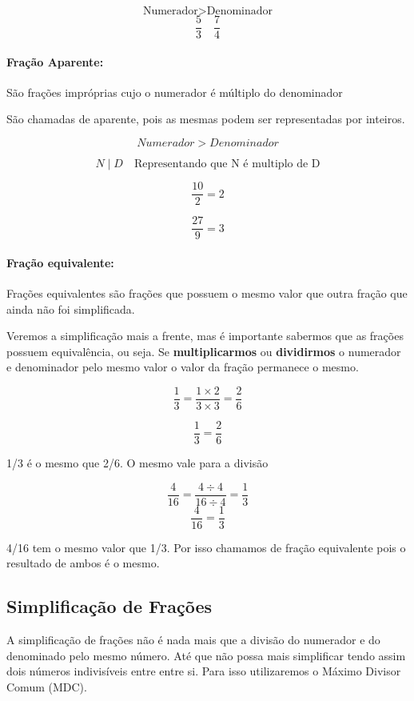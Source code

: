 \documentclass[letterpaper]{book}
\begin{document}
\[\text{Numerador} > \text{Denominador}\]
\[\dfrac{5}{3} \quad \dfrac{7}{4}\]

\paragraph{Fração Aparente:} São frações impróprias cujo o numerador é múltiplo do denominador

São chamadas de aparente, pois as mesmas podem ser representadas por inteiros.

\[Numerador > Denominador\]

\[N \mid D \quad \text{Representando que N é multiplo de D}\]

\[\dfrac{10}{2} = 2\]

\[\dfrac{27}{9} = 3\]

\paragraph{Fração equivalente:} Frações equivalentes são frações que possuem o mesmo valor que outra fração que ainda não foi simplificada.

Veremos a simplificação mais a frente, mas é importante sabermos que as frações possuem equivalência, ou seja.
Se \textbf{multiplicarmos} ou \textbf{dividirmos} o numerador e denominador pelo mesmo valor o valor da fração permanece o mesmo.

\[\dfrac{1}{3} = \dfrac{1 \times 2}{3 \times 3} = \dfrac{2}{6}\]

\[\dfrac{1}{3} = \dfrac{2}{6}\]

1/3 é o mesmo que 2/6. O mesmo vale para a divisão

\[\dfrac{4}{16} = \dfrac{4 \div 4}{16 \div 4} = \dfrac{1}{3}\]
\[\dfrac{4}{16} = \dfrac{1}{3}\]

4/16 tem o mesmo valor que 1/3. Por isso chamamos de fração equivalente pois o resultado de ambos é o mesmo.

\subsection{Simplificação de Frações}

A simplificação de frações não é nada mais que a divisão do numerador e do denominado pelo mesmo número. Até que não possa mais simplificar tendo assim dois números indivisíveis entre entre si. Para isso utilizaremos o Máximo Divisor Comum (MDC).

\vspace{0.5em}
\end{document}
